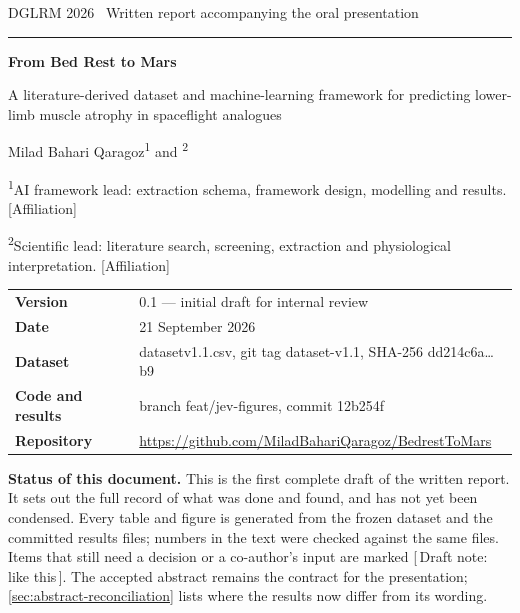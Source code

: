 \documentclass[11pt,a4paper]{article}
\newcommand{\breakable}{\def\_{\textunderscore\allowbreak}\def\/{/\allowbreak}}
\DeclareRobustCommand{\code}[1]{{\small\ttfamily\breakable #1}}
\newcommand{\ReportBranch}{\code{feat/jev-figures}}
\newcommand{\ReportCommit}{\code{12b254f}}
\newcommand{\DatasetHash}{\code{dd214c6a\ldots b9}}
\newcommand{\draftnote}[1]{{\color{accent}\sffamily\small[\,Draft note: #1\,]}}
\begin{document}
\begin{titlepage}
\thispagestyle{empty}
\sffamily
\vspace*{-0.6cm}
{\small\color{inktwo}DGLRM 2026 \textperiodcentered\ Written report accompanying the oral presentation\par}
\vspace{0.3cm}
{\color{accent}\rule{\linewidth}{1.2pt}}
\vspace{0.9cm}

{\fontsize{24}{29}\selectfont\bfseries From Bed Rest to Mars\par}
\vspace{0.35cm}
{\Large A literature-derived dataset and machine-learning framework for predicting lower-limb muscle atrophy in spaceflight analogues\par}
\vspace{1.0cm}

{\large Milad Bahari Qaragoz\textsuperscript{1} \quad and \quad [Co-author]\textsuperscript{2}\par}
\vspace{0.3cm}
{\small\color{inktwo}
\textsuperscript{1}AI framework lead: extraction schema, framework design, modelling and results. [Affiliation]\par
\textsuperscript{2}Scientific lead: literature search, screening, extraction and physiological interpretation. [Affiliation]\par}
\vspace{1.0cm}

\begin{tabular}{@{}ll@{}}
\textbf{Version} & 0.1 --- initial draft for internal review \\
\textbf{Date} & 21 September 2026 \\
\textbf{Dataset} & \code{dataset\_v1.1.csv}, git tag \code{dataset-v1.1}, SHA-256 \DatasetHash \\
\textbf{Code and results} & branch \ReportBranch, commit \ReportCommit \\
\textbf{Repository} & \url{https://github.com/MiladBahariQaragoz/BedrestToMars} \\
\end{tabular}

\vfill
\begin{tcolorbox}[colback=notebg,colframe=accent,boxrule=0.6pt,arc=2pt,left=8pt,right=8pt,top=6pt,bottom=6pt,
  fontupper=\small\sffamily]
\textbf{\color{accent}Status of this document.} This is the first complete draft of the written report. It sets
out the full record of what was done and found, and has not yet been condensed. Every table and figure is
generated from the frozen dataset and the committed results files; numbers in the text were checked against the
same files. Items that still need a decision or a co-author's input are marked \draftnote{like this}. The accepted
abstract remains the contract for the presentation; \cref{sec:abstract-reconciliation} lists where the results now
differ from its wording.
\end{tcolorbox}
\end{titlepage}
\end{document}
